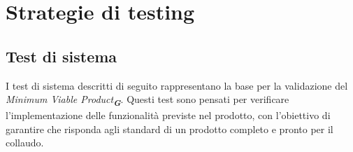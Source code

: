 


\section{Strategie di testing}
\label{sec:strategie di testing}

\subsection{Test di sistema}
\label{sec:Test di sistema}
I test di sistema descritti di seguito rappresentano la base per la validazione del \emph{Minimum Viable Product}\textsubscript{\textit{\textbf{G}}}. 
Questi test sono pensati per verificare l’implementazione delle funzionalità previste nel prodotto, 
con l’obiettivo di garantire che risponda agli standard di un prodotto completo e pronto per il collaudo.

